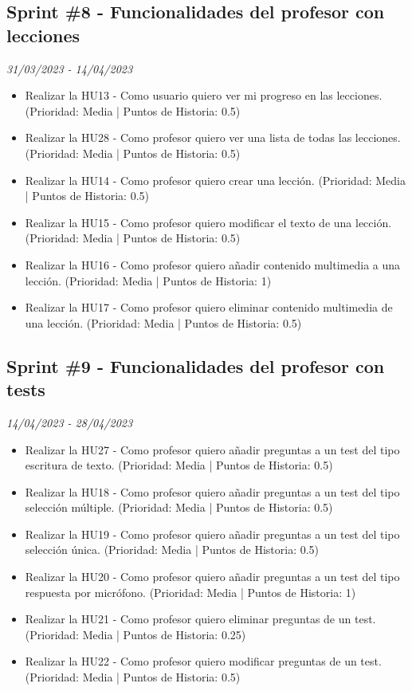\subsection{Sprint \#8 - Funcionalidades del profesor con lecciones}
\textit{31/03/2023   -   14/04/2023}
\begin{itemize}

\item Realizar la HU13 - Como usuario quiero ver mi progreso en las lecciones. (Prioridad: Media | Puntos de Historia: 0.5)
\item Realizar la HU28 - Como profesor quiero ver una lista de todas las lecciones. (Prioridad: Media | Puntos de Historia: 0.5)
\item Realizar la HU14 - Como profesor quiero crear una lección. (Prioridad: Media | Puntos de Historia: 0.5)
\item Realizar la HU15 - Como profesor quiero modificar el texto de una lección. (Prioridad: Media | Puntos de Historia: 0.5)
\item Realizar la HU16 - Como profesor quiero añadir contenido multimedia a una lección. (Prioridad: Media | Puntos de Historia: 1)
\item Realizar la HU17 - Como profesor quiero eliminar contenido multimedia de una lección. (Prioridad: Media | Puntos de Historia: 0.5)
\end{itemize}

\subsection{Sprint \#9 - Funcionalidades del profesor con tests}
\textit{14/04/2023   -   28/04/2023}
\begin{itemize}
\item Realizar la HU27 - Como profesor quiero añadir preguntas a un test del tipo escritura de texto. (Prioridad: Media | Puntos de Historia: 0.5)
\item Realizar la HU18 - Como profesor quiero añadir preguntas a un test del tipo selección múltiple. (Prioridad: Media | Puntos de Historia: 0.5)
\item Realizar la HU19 - Como profesor quiero añadir preguntas a un test del tipo selección única. (Prioridad: Media | Puntos de Historia: 0.5)
\item Realizar la HU20 - Como profesor quiero añadir preguntas a un test del tipo respuesta por micrófono. (Prioridad: Media | Puntos de Historia: 1)
\item Realizar la HU21 - Como profesor quiero eliminar preguntas de un test. (Prioridad: Media | Puntos de Historia: 0.25)
\item Realizar la HU22 - Como profesor quiero modificar preguntas de un test. (Prioridad: Media | Puntos de Historia: 0.5)
\end{itemize}

